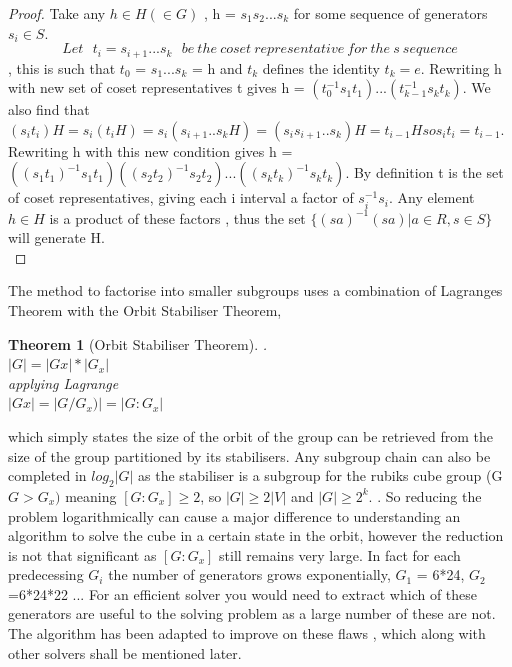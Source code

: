 \documentclass{article}
\newtheorem{theorem}{Theorem}[section]
\begin{document}
\begin{proof}
Take any $h\in H (\in G)$ , h = $s_{1}s_{2}...s_{k}$ for some sequence of generators $s_{i} \in S$.
\[Let\ \ \ t_{i} = s_{i+1}...s_{k}\ \ \ be\ the\ coset\ representative\ for\ the\ s\ sequence\] , this is such that $t_{0}$ = $s_{1}...s_{k}$ = h and $t_{k}$ defines the identity $t_{k} = e$.
Rewriting h with new set of coset representatives t gives h = $(t_{0}^{-1} s_{1} t_{1}) ...(t_{k-1}^{-1} s_{k} t_{k})$.
We also find that $(s_{i} t_{i})H = s_{i}(t_{i} H) = s_{i} ( s_{i+1}..s_{k} H) = (s_{i}s_{i+1}..s_{k})H = t_{i-1} H so s_{i} t_{i} = t_{i-1}.$
Rewriting h with this new condition gives h = $((s_{1} t_{1})^{-1} s_{1} t_{1})((s_{2} t_{2})^{-1} s_{2} t_{2}) ...((s_{k} t_{k})^{-1} s_{k} t_{k})$.
By definition t is the set of coset representatives, giving each i interval a factor of $s_{i}^{-1}s_{i}$. Any element $h \in H$ is a product of these factors , thus the set $\{(sa)^{-1} (sa) | a \in R, s \in S \}$ will generate H.\\
\end{proof}
The method to factorise into smaller subgroups uses a combination of Lagranges Theorem with the Orbit Stabiliser Theorem, 
\begin{theorem}[Orbit Stabiliser Theorem]
.\\
$|G|= |Gx|*|G_{x}|$\\
applying Lagrange\\
$|Gx|=|G/G_{x})|=|G:G_{x}|$
\end{theorem}
which simply states the size of the orbit of the group can be retrieved from the size of the group partitioned by its stabilisers. Any subgroup chain can also be completed in $log_{2}|G|$ as the stabiliser is a subgroup for the rubiks cube group (G $G>G_{x})$ meaning $[G:G_{x}]\geq 2$, so $|G|\geq2|V|$ and $|G|\geq 2^{k}.$
\cite{OrbStab}. So reducing the problem logarithmically can cause a major difference to understanding an algorithm to solve the cube in a certain state in the orbit, however the reduction is not that significant as $[G:G_{x}]$ still remains very large. In fact for each predecessing $G_{i}$ the number of generators grows exponentially, $G_{1}$ = 6*24, $G_{2}$=6*24*22 ... For an efficient solver you would need to extract which of these generators are useful to the solving problem as a large number of these are not. The algorithm has been adapted to improve on these flaws , which along with other solvers shall be mentioned later.
\end{document}
